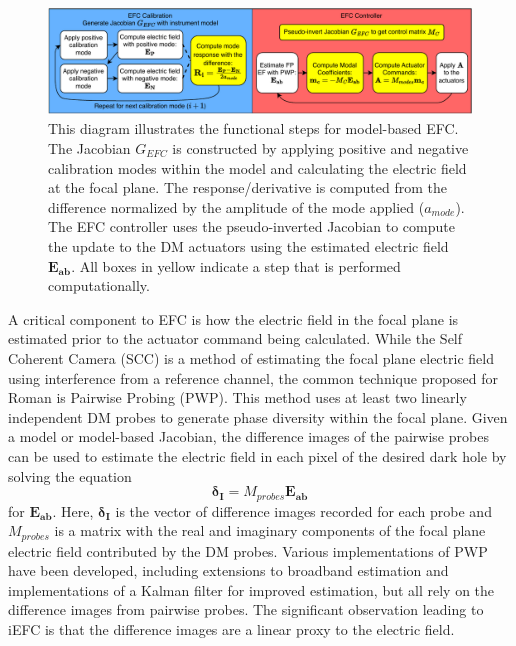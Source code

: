 \documentclass[12pt]{spieman}  %
\begin{document}
\begin{spacing}{2}
\begin{figure}[H]
    \centering
    \includegraphics[scale=0.75]{figs-general/efc_flow.pdf}
    \caption{This diagram illustrates the functional steps for model-based EFC. The Jacobian $G_{EFC}$ is constructed by applying positive and negative calibration modes within the model and calculating the electric field at the focal plane. The response/derivative is computed from the difference normalized by the amplitude of the mode applied ($a_{mode}$). The EFC controller uses the pseudo-inverted Jacobian to compute the update to the DM actuators using the estimated electric field $\mathbf{E_{ab}}$. All boxes in yellow indicate a step that is performed computationally.}
    \label{fig:efc-flowchart}
\end{figure}

A critical component to EFC is how the electric field in the focal plane is estimated prior to the actuator command being calculated. While the Self Coherent Camera (SCC) is a method of estimating the focal plane electric field using interference from a reference channel\cite{baudoz2005self}, the common technique proposed for Roman is Pairwise Probing (PWP)\cite{krists-bible}. This method uses at least two linearly independent DM probes to generate phase diversity within the focal plane. Given a model or model-based Jacobian, the difference images of the pairwise probes can be used to estimate the electric field in each pixel of the desired dark hole by solving the equation 
\begin{equation}
\label{eq:pwp}  
\mathbf{\delta_I} = M_{probes} \mathbf{E_{ab}} 
\end{equation} 
\noindent for $\mathbf{E_{ab}}$\cite{give'on-pwp}. Here, $\mathbf{\delta_I}$ is the vector of difference images recorded for each probe and $M_{probes}$ is a matrix with the real and imaginary components of the focal plane electric field contributed by the DM probes. Various implementations of PWP have been developed, including extensions to broadband estimation\cite{redmond-pwp} and implementations of a Kalman filter for improved estimation\cite{groff-pwp-kf}, but all rely on the difference images from pairwise probes. The significant observation leading to iEFC is that the difference images are a linear proxy to the electric field.


\end{spacing}
\end{document}
